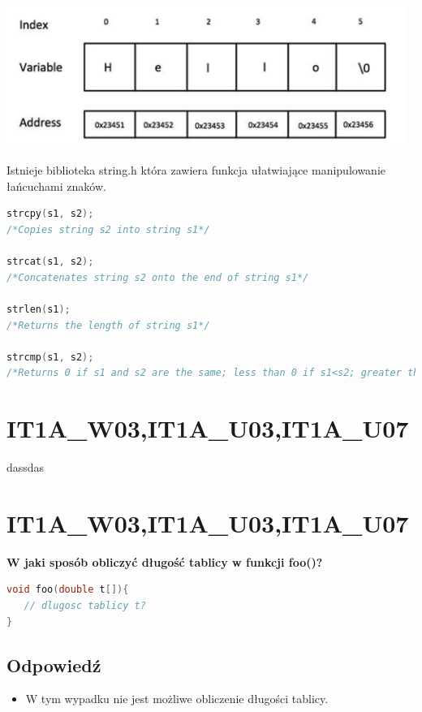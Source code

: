 \begin{center}
\includegraphics[width=13cm]{string_in_c}
\end{center}

Istnieje biblioteka string.h która zawiera funkcja ułatwiające manipulowanie łańcuchami znaków.
\begin{lstlisting}[language=c]
strcpy(s1, s2); 
/*Copies string s2 into string s1*/

strcat(s1, s2);
/*Concatenates string s2 onto the end of string s1*/

strlen(s1);
/*Returns the length of string s1*/

strcmp(s1, s2);
/*Returns 0 if s1 and s2 are the same; less than 0 if s1<s2; greater than 0 if s1>s2*/
\end{lstlisting}


\section{IT1A\_W03,IT1A\_U03,IT1A\_U07}dassdas


\section{IT1A\_W03,IT1A\_U03,IT1A\_U07} 
\textbf{W jaki sposób obliczyć długość tablicy w funkcji foo()?}
\begin{lstlisting}[language=c]
void foo(double t[]){
   // dlugosc tablicy t?
}
\end{lstlisting}

\subsection{Odpowiedź}
\begin{itemize}
\item W tym wypadku nie jest możliwe obliczenie długości tablicy.\\
\end{itemize}

